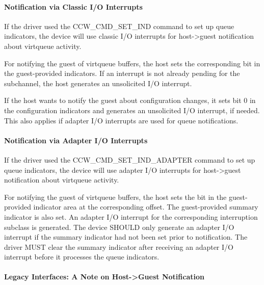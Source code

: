 \paragraph{Notification via Classic I/O Interrupts}\label{sec:Virtio Transport Options / Virtio over channel I/O / Device Operation / Host->Guest Notification / Notification via Classic I/O Interrupts}

If the driver used the CCW_CMD_SET_IND command to set up queue
indicators, the device will use classic I/O interrupts for
host->guest notification about virtqueue activity.

For notifying the guest of virtqueue buffers, the host sets the
corresponding bit in the guest-provided indicators. If an
interrupt is not already pending for the subchannel, the host
generates an unsolicited I/O interrupt.

If the host wants to notify the guest about configuration
changes, it sets bit 0 in the configuration indicators and
generates an unsolicited I/O interrupt, if needed. This also
applies if adapter I/O interrupts are used for queue notifications.

\paragraph{Notification via Adapter I/O Interrupts}\label{sec:Virtio Transport Options / Virtio over channel I/O / Device Operation / Host->Guest Notification / Notification via Adapter I/O Interrupts}

If the driver used the CCW_CMD_SET_IND_ADAPTER command to set up
queue indicators, the device will use adapter I/O interrupts for
host->guest notification about virtqueue activity.

For notifying the guest of virtqueue buffers, the host sets the
bit in the guest-provided indicator area at the corresponding offset.
The guest-provided summary indicator is also set. An adapter I/O
interrupt for the corresponding interruption subclass is generated.
The device SHOULD only generate an adapter I/O interrupt if the
summary indicator had not been set prior to notification. The driver
MUST clear the summary indicator after receiving an adapter I/O
interrupt before it processes the queue indicators.

\paragraph{Legacy Interfaces: A Note on Host->Guest Notification}\label{sec:Virtio Transport Options / Virtio over channel I/O / Device Operation / Host->Guest Notification / Legacy Interfaces: A Note on Host->Guest Notification}

